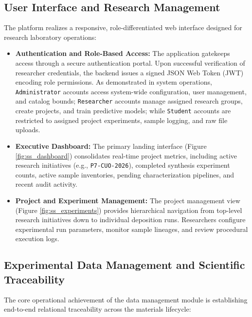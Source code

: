 \documentclass[12pt,a4paper,oneside]{report}
\begin{document}
{{{\subsection{User Interface and Research Management}

The platform realizes a responsive, role-differentiated web interface designed for research laboratory operations:

\begin{itemize}
    \item \textbf{Authentication and Role-Based Access:} The application gatekeeps access through a secure authentication portal. Upon successful verification of researcher credentials, the backend issues a signed JSON Web Token (JWT) encoding role permissions. As demonstrated in system operations, \texttt{Administrator} accounts access system-wide configuration, user management, and catalog bounds; \texttt{Researcher} accounts manage assigned research groups, create projects, and train predictive models; while \texttt{Student} accounts are restricted to assigned project experiments, sample logging, and raw file uploads.
    \item \textbf{Executive Dashboard:} The primary landing interface (Figure \ref{fig:ss_dashboard}) consolidates real-time project metrics, including active research initiatives (e.g., \texttt{P7-CUO-2026}), completed synthesis experiment counts, active sample inventories, pending characterization pipelines, and recent audit activity.
    \item \textbf{Project and Experiment Management:} The project management view (Figure \ref{fig:ss_experiments}) provides hierarchical navigation from top-level research initiatives down to individual deposition runs. Researchers configure experimental run parameters, monitor sample lineages, and review procedural execution logs.
\end{itemize}

\subsection{Experimental Data Management and Scientific Traceability}

The core operational achievement of the data management module is establishing end-to-end relational traceability across the materials lifecycle:

}}}
\end{document}
